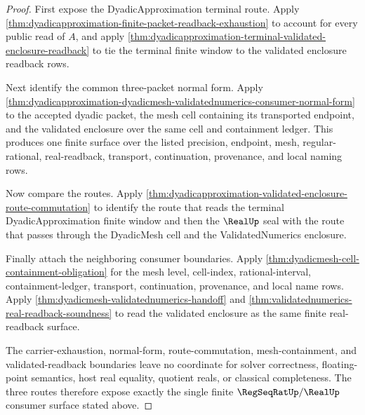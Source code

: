 \begin{proof}
First expose the DyadicApproximation terminal route. Apply
\autoref{thm:dyadicapproximation-finite-packet-readback-exhaustion} to account
for every public read of $A$, and apply
\autoref{thm:dyadicapproximation-terminal-validated-enclosure-readback} to tie
the terminal finite window to the validated enclosure readback rows.

Next identify the common three-packet normal form. Apply
\autoref{thm:dyadicapproximation-dyadicmesh-validatednumerics-consumer-normal-form}
to the accepted dyadic packet, the mesh cell containing its transported
endpoint, and the validated enclosure over the same cell and containment
ledger. This produces one finite surface over the listed precision, endpoint,
mesh, regular-rational, real-readback, transport, continuation, provenance, and
local naming rows.

Now compare the routes. Apply
\autoref{thm:dyadicapproximation-validated-enclosure-route-commutation} to
identify the route that reads the terminal DyadicApproximation finite window
and then the $\RealUp$ seal with the route that passes through the DyadicMesh
cell and the ValidatedNumerics enclosure.

Finally attach the neighboring consumer boundaries. Apply
\autoref{thm:dyadicmesh-cell-containment-obligation} for the mesh level,
cell-index, rational-interval, containment-ledger, transport, continuation,
provenance, and local name rows. Apply
\autoref{thm:dyadicmesh-validatednumerics-handoff} and
\autoref{thm:validatednumerics-real-readback-soundness} to read the validated
enclosure as the same finite real-readback surface.

The carrier-exhaustion, normal-form, route-commutation, mesh-containment, and
validated-readback boundaries leave no coordinate for solver correctness,
floating-point semantics, host real equality, quotient reals, or classical
completeness. The three routes therefore expose exactly the single finite
$\RegSeqRatUp/\RealUp$ consumer surface stated above.
\end{proof}
